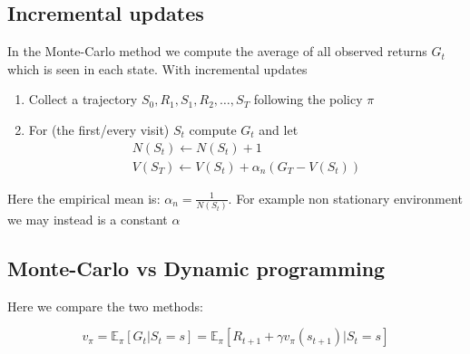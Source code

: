 \subsection*{Incremental updates}
In the Monte-Carlo method we compute the average of all observed returns $G_t$ which is seen in each state. With incremental updates 

	\begin{enumerate}
		\item Collect a trajectory $S_0, R_1, S_1, R_2, \ldots, S_T$ following the policy $\pi$
		\item For (the first/every visit) $S_t$ compute $G_t$ and let 
			\begin{equation}
			\begin{aligned}
				N(S_t) \leftarrow N(S_t) + 1\\
				V(S_T) \leftarrow V(S_t) + \alpha_n (G_T - V(S_t))
			\end{aligned}
			\end{equation}
	\end{enumerate}

Here the empirical mean is: $\alpha_n = \frac{1} {N(S_t)}$. For example non stationary environment we may instead is a constant $\alpha$

\subsection*{Monte-Carlo vs Dynamic programming}
Here we compare the two methods:

	\begin{equation}
		v_\pi = \mathbb{E}_\pi[G_t |S_t = s] = \mathbb{E}_\pi [R_{t+1}+\gamma v_\pi(s_{t+1}) | S_t = s]
	\end{equation}

